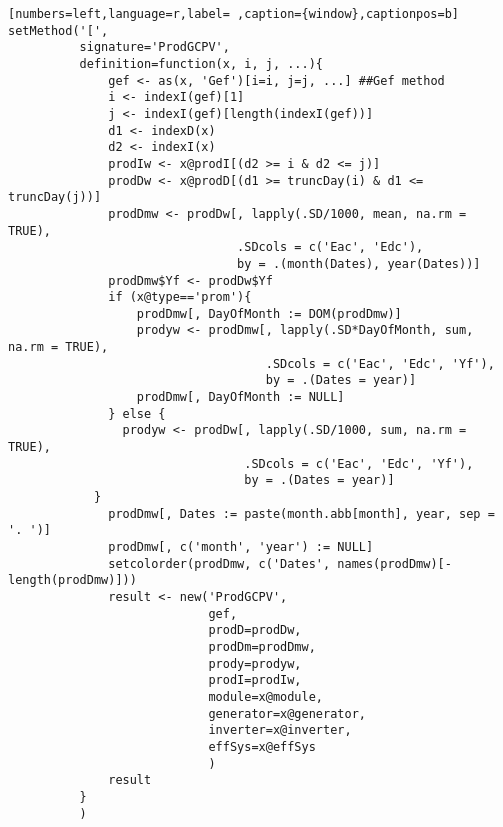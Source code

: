 \begin{lstlisting}[numbers=left,language=r,label= ,caption={window},captionpos=b]
setMethod('[',
          signature='ProdGCPV',
          definition=function(x, i, j, ...){
              gef <- as(x, 'Gef')[i=i, j=j, ...] ##Gef method
              i <- indexI(gef)[1]
              j <- indexI(gef)[length(indexI(gef))]
              d1 <- indexD(x)
              d2 <- indexI(x)
              prodIw <- x@prodI[(d2 >= i & d2 <= j)]
              prodDw <- x@prodD[(d1 >= truncDay(i) & d1 <= truncDay(j))]
              prodDmw <- prodDw[, lapply(.SD/1000, mean, na.rm = TRUE),
                                .SDcols = c('Eac', 'Edc'),
                                by = .(month(Dates), year(Dates))]
              prodDmw$Yf <- prodDw$Yf
              if (x@type=='prom'){
                  prodDmw[, DayOfMonth := DOM(prodDmw)]
                  prodyw <- prodDmw[, lapply(.SD*DayOfMonth, sum, na.rm = TRUE),
                                    .SDcols = c('Eac', 'Edc', 'Yf'),
                                    by = .(Dates = year)]
                  prodDmw[, DayOfMonth := NULL]
              } else {
                prodyw <- prodDw[, lapply(.SD/1000, sum, na.rm = TRUE),
                                 .SDcols = c('Eac', 'Edc', 'Yf'),
                                 by = .(Dates = year)]
            }
              prodDmw[, Dates := paste(month.abb[month], year, sep = '. ')]
              prodDmw[, c('month', 'year') := NULL]
              setcolorder(prodDmw, c('Dates', names(prodDmw)[-length(prodDmw)]))
              result <- new('ProdGCPV',
                            gef,
                            prodD=prodDw,
                            prodDm=prodDmw,
                            prody=prodyw,
                            prodI=prodIw,
                            module=x@module,
                            generator=x@generator,
                            inverter=x@inverter,
                            effSys=x@effSys
                            )
              result
          }
          )


\end{lstlisting}
